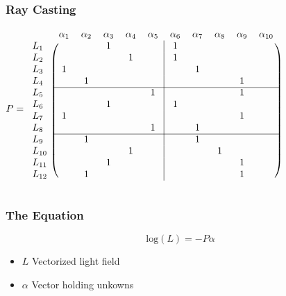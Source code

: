 \documentclass[12pt, compress]{beamer}
\begin{document}
\begin{frame}[fragile]
	\frametitle{Ray Casting}
	$
		P = 
		\begin{blockarray}{lcccccccccc}
		    				& \alpha_1 	& \alpha_2 	& \alpha_3 	& \alpha_4 	& \alpha_5 	& \alpha_6 	& \alpha_7 	& \alpha_8 	& \alpha_9 	& \alpha_{10}	\\
		    \begin{block}{l(ccccc|ccccc@{\hspace*{5pt}})}
			  L_1 	& 	 		& 			& 	1		& 			& 			& 	1		&			&			&			&				\\
			  L_2 	& 			& 			& 			& 	1		& 			& 	1		&			&			&			&				\\
			  L_3 	& 	1		& 			& 			& 			& 			& 			&	1		&			&			&				\\
			  L_4 	& 			& 	1		& 			& 			& 			& 			&			&			&	1		&				\\
			  \cline{2-11}
			  L_5 	& 			& 			& 			& 			& 	1		& 			&			&			&	1		&				\\
			  L_6 	& 			& 			& 	1		& 			& 			& 1			&			&			&			&				\\
			  L_7 	& 		1	& 			& 			& 			& 			& 			&			&			&	1		&				\\
			  L_8 	& 			& 			& 			& 	 		& 	1		& 			&	1		&			&			&				\\
			  \cline{2-11}
			  L_9 	& 			& 	1		& 			& 			& 			& 			&	1		&			& 			&				\\
			  L_{10} 	& 			& 			& 			& 		1	& 			& 			&			&	1		&			&				\\
			  L_{11} 	& 			& 			& 	1		& 			& 			& 			&			&			&	1		&				\\
			  L_{12} 	& 			& 	1		& 			& 	 		& 			& 			&			&			&	1		&				\\			  
		    \end{block}
		\end{blockarray}
	$
\end{frame}

\begin{frame}[fragile]
	\frametitle{The Equation}
	
	{\LARGE
		\begin{equation*}
			\text{log}(L) = - P \alpha
		\end{equation*}
	}
	\begin{itemize}[<alert@+>]
		\item $L$ Vectorized light field
		\item $\alpha$ Vector holding unkowns
	\end{itemize}
\end{frame}
\end{document}
